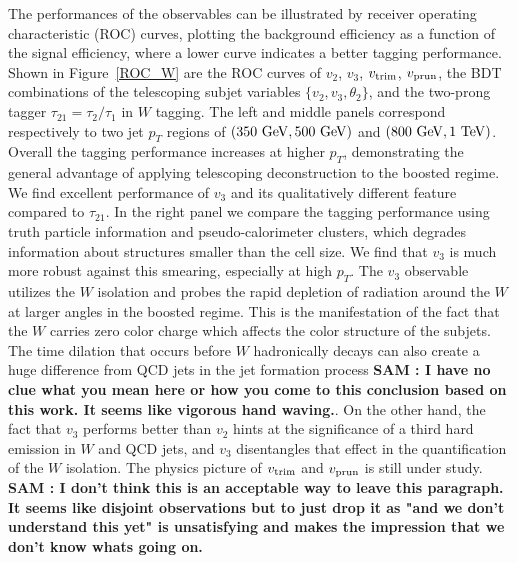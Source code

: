 \documentclass[aps,prl,floatfix,preprintnumbers,twocolumn,groupedaddress,nofootinbib]{revtex4-1}
\begin{document}
The performances of the observables can be illustrated by receiver operating characteristic (ROC) curves, plotting the background efficiency as a function of the signal efficiency, where a lower curve indicates a better tagging performance. Shown in Figure~\ref{ROC_W} are the ROC curves of $v_2$, $v_3$, $v_{\rm trim}$, $v_{\rm prun}$, the BDT combinations of the telescoping subjet variables $\{v_2, v_3, \theta_2\}$, and the two-prong tagger $\tau_{21}=\tau_{2}/\tau_{1}$ in $W$ tagging. The left and middle panels correspond respectively to two jet $p_T$ regions of $(350~{\rm GeV}, 500~{\rm GeV})$ and $(800~{\rm GeV}, 1~{\rm TeV})$. Overall the tagging performance increases at higher $p_T$, demonstrating the general advantage of applying telescoping deconstruction to the boosted regime. We find excellent performance of $v_3$ and its qualitatively different feature compared to $\tau_{21}$. In the right panel we compare the tagging performance using truth particle information and pseudo-calorimeter clusters, which degrades information about structures smaller than the cell size. We find that $v_3$ is much more robust against this smearing, especially at high $p_T$. The $v_3$ observable utilizes the $W$ isolation and probes the rapid depletion of radiation around the $W$ at larger angles in the boosted regime. This is the manifestation of the fact that the $W$ carries zero color charge which affects the color structure of the subjets. The time dilation that occurs before $W$ hadronically decays can also create a huge difference from QCD jets in the jet formation process\textbf{\color{blue} SAM : I have no clue what you mean here or how you come to this conclusion based on this work.  It seems like vigorous hand waving.}. On the other hand, the fact that $v_3$ performs better than $v_2$ hints at the significance of a third hard emission in $W$ and QCD jets, and $v_3$ disentangles that effect in the quantification of the $W$ isolation. The physics picture of $v_{\rm trim}$ and $v_{\rm prun}$ is still under study.\textbf{\color{blue} SAM : I don't think this is an acceptable way to leave this paragraph.  It seems like disjoint observations but to just drop it as "and we don't understand this yet" is unsatisfying and makes the impression that we don't know whats going on.}
\end{document}
